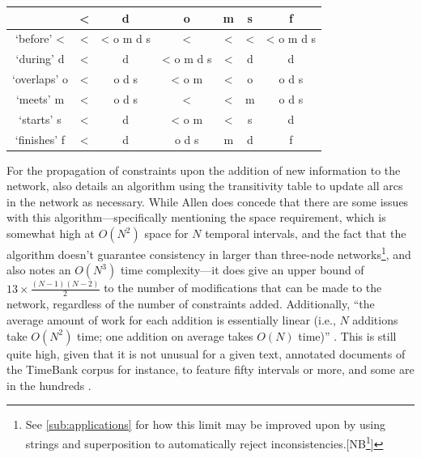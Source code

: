 \documentclass[a4paper,12pt,leqno]{article}
\makeatletter
\newcommand*\bigcdot{\mathpalette\bigcdot@{0.75}}
\newcommand*\bigcdot@[2]{\mathbin{\vcenter{\hbox{\scalebox{#2}{$\m@th#1\bullet$}}}}}
\newcommand{\selfnote}[1]{{\color{red}[NB\footnote{{\color{red}#1}}]}}
\newcommand{\nb}{\selfnote}
\makeatother
\begin{document}
\begin{center}
	\onehalfspacing
	\begin{tabular}{|c|c|c|c|c|c|c|}
		\hline
		\diagbox{$A \bigcdot B$}{$B \bigcdot' C$} & \textless{} & d & o & m & s & f\\
		\hline
		`before' \textless{} & \textless{} & \textless{} o m d s & \textless{} & \textless{} & \textless{} & \textless{} o m d s\\
		\hline
		`during' d & \textless{} & d & \textless{} o m d s & \textless{} & d & d\\
		\hline
		`overlaps' o & \textless{} & o d s & \textless{} o m & \textless{} & o & o d s\\
		\hline
		`meets' m & \textless{} & o d s & \textless{} & \textless{} & m & o d s\\
		\hline
		`starts' s & \textless{} & d & \textless{} o m & \textless{} & s & d\\
		\hline
		`finishes' f & \textless{} & d & o d s & m & d & f\\
		\hline
	\end{tabular}
	\label{tab:allen-trans-table}
\end{center}
For the propagation of constraints upon the addition of new information to the network, \citet[p. 835]{allen1983maintaining} also details an algorithm using the transitivity table to update all arcs in the network as necessary. While Allen does concede that there are some issues with this algorithm---specifically mentioning the space requirement, which is somewhat high at $O(N^2)$ space for $N$ temporal intervals, and the fact that the algorithm doesn't guarantee consistency in larger than three-node networks\footnote{See \cref{sub:applications} for how this limit may be improved upon by using strings and superposition to automatically reject inconsistencies.\nb{Check this reference}}, and \citet[p. 219]{Verhagen2005} also notes an $O(N^3)$ time complexity---it does give an upper bound of $13 \times \frac{(N - 1)(N - 2)}{2}$ to the number of modifications that can be made to the network, regardless of the number of constraints added. Additionally, ``the average amount of work for each addition is essentially linear (i.e., $N$ additions take $O(N^2)$ time; one addition on average takes $O(N)$ time)'' \citep[p. 837]{allen1983maintaining}. This is still quite high, given that it is not unusual for a given text, annotated documents of the TimeBank \citep{pustejovsky2003timebank,pustejovsky2006timebank} corpus for instance, to feature fifty intervals or more, and some are in the hundreds \citep[p. 213]{Verhagen2005}.
\end{document}
